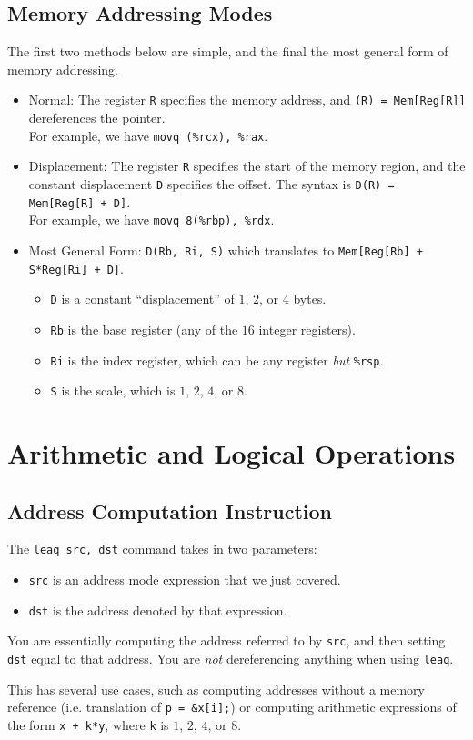 \documentclass[class=article, crop=false]{standalone}
\begin{document}
  \subsection{Memory Addressing Modes}
  The first two methods below are simple, and the final the most general form of memory addressing.
  \begin{itemize}
    \item Normal: The register \texttt{R} specifies the memory address, and \texttt{(R) = Mem[Reg[R]]} dereferences the pointer. \\
    For example, we have \texttt{movq (\%rcx), \%rax}.
    \item Displacement: The register \texttt{R} specifies the start of the memory region, and the constant displacement \texttt{D} specifies the offset. The syntax is \texttt{D(R) = Mem[Reg[R] + D]}. \\
    For example, we have \texttt{movq 8(\%rbp), \%rdx}.
    \item Most General Form: \texttt{D(Rb, Ri, S)} which translates to \texttt{Mem[Reg[Rb] + S*Reg[Ri] + D]}.
    \begin{itemize}
      \item \texttt{D} is a constant ``displacement'' of $1$, $2$, or $4$ bytes.
      \item \texttt{Rb} is the base register (any of the $16$ integer registers).
      \item \texttt{Ri} is the index register, which can be any register \emph{but} \texttt{\%rsp}.
      \item \texttt{S} is the scale, which is $1$, $2$, $4$, or $8$.
    \end{itemize}
  \end{itemize}
  \section{Arithmetic and Logical Operations}
  \subsection{Address Computation Instruction}
  The \texttt{leaq src, dst} command takes in two parameters:
  \begin{itemize}
    \item \texttt{src} is an address mode expression that we just covered.
    \item \texttt{dst} is the address denoted by that expression.
  \end{itemize}
  \begin{note}{}
    You are essentially computing the address referred to by \texttt{src}, and then setting \texttt{dst} equal to that address. You are \emph{not} dereferencing anything when using \texttt{leaq}.
  \end{note}
  This has several use cases, such as computing addresses without a memory reference (i.e. translation of \texttt{p = \&x[i];}) or computing arithmetic expressions of the form \texttt{x + k*y}, where \texttt{k} is $1$, $2$, $4$, or $8$.
\end{document}
